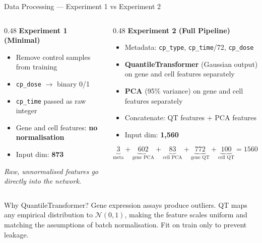 \documentclass[aspectratio=169, 10pt]{beamer}
\begin{document}
\begin{frame}{Data Processing — Experiment 1 vs Experiment 2}
  \begin{columns}[T]
    \begin{column}{0.48\textwidth}
      \textbf{\color{darkred}Experiment 1 (Minimal)}
      \begin{itemize}
        \item Remove control samples from training
        \item \texttt{cp\_dose} $\to$ binary 0/1
        \item \texttt{cp\_time} passed as raw integer
        \item Gene and cell features: \textbf{no normalisation}
        \item Input dim: \textbf{873}
      \end{itemize}
      \vspace{0.4em}
      \textit{Raw, unnormalised features go directly into the network.}
    \end{column}
    \begin{column}{0.48\textwidth}
      \textbf{\color{midblue}Experiment 2 (Full Pipeline)}
      \begin{itemize}
        \item Metadata: \texttt{cp\_type}, \texttt{cp\_time}/72, \texttt{cp\_dose}
        \item \textbf{QuantileTransformer} (Gaussian output) on gene and cell features separately
        \item \textbf{PCA} (95\% variance) on gene and cell features separately
        \item Concatenate: QT features + PCA features
        \item Input dim: \textbf{1,560}
      \end{itemize}
      \[
        \underbrace{3}_{\text{meta}}
        + \underbrace{602}_{\text{gene PCA}}
        + \underbrace{83}_{\text{cell PCA}}
        + \underbrace{772}_{\text{gene QT}}
        + \underbrace{100}_{\text{cell QT}}
        = 1560
      \]
    \end{column}
  \end{columns}

  \vspace{0.5em}
  \begin{exampleblock}{Why QuantileTransformer?}
    Gene expression assays produce outliers. QT maps any empirical distribution to
    $\mathcal{N}(0,1)$, making the feature scales uniform and matching the
    assumptions of batch normalisation. Fit on train only to prevent leakage.
  \end{exampleblock}
\end{frame}
\end{document}

